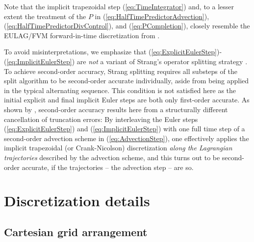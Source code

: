 \documentclass{ametsoc}
\theoremstyle{definition}
\newcommand{\eq}[1]{(\ref{#1})}
\begin{document}
Note that the implicit trapezoidal step \eq{eq:TimeIntegrator} and, to a 
lesser extent the treatment of the $P$ in \eq{eq:HalfTimePredictorAdvection}, 
\eq{eq:HalfTimePredictorDivControl}, and \eq{eq:PCompletion}, closely resemble the EULAG/FVM forward-in-time discretization from 
\citet{SmolarkiewiczMargolin1997,PrusaEtAl2008,SmolarkiewiczEtAl2014,SmolarkiewiczEtAl2016, KuehnleinEtAl2019}. 

To avoid misinterpretations, we emphasize that 
\eq{eq:ExplicitEulerStep}-\eq{eq:ImplicitEulerStep} are \emph{not} a
variant of Strang's operator splitting strategy \citep{Strang1968}. To
achieve second-order accuracy, Strang splitting requires all substeps of 
the split algorithm to be second-order accurate individually, aside from
being applied in the typical alternating sequence. This condition is not 
satisfied here as the initial explicit and final implicit Euler steps are 
both only first-order accurate. As shown by \citet{SmolarkiewiczMargolin1993}, 
second-order accuracy results here from a structurally different cancellation 
of truncation errors: By interleaving the Euler steps \eq{eq:ExplicitEulerStep} 
and \eq{eq:ImplicitEulerStep} with one full time step of a second-order 
advection scheme in \eq{eq:AdvectionStep}, one effectively applies the
implicit trapezoidal (or Crank-Nicolson) discretization 
\emph{along the Lagrangian trajectories} described by the advection scheme, 
and this turns out to be second-order accurate, if the trajectories -- the advection step -- are so. 




\section{Discretization details}
\label{sec:DiscretizationDetails}


\subsection{Cartesian grid arrangement}
\label{ssec:GridArrangement}
\end{document}
